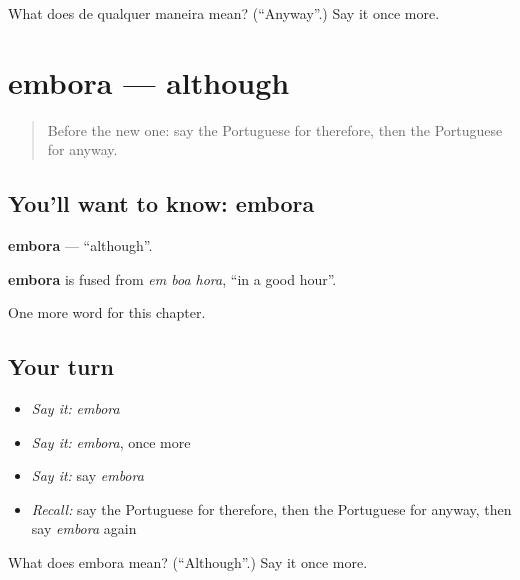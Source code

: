 \begin{tcolorbox}[breakable,colback=teal!4,colframe=teal!35!black,title={Before you move on}]
What does de qualquer maneira mean? (\textquotedblleft{}Anyway\textquotedblright{}.) Say it once more.
\end{tcolorbox}
\section[embora]{embora — although}

\label{lesson:PT-C152-embora}



\begin{quote}
Before the new one: say the Portuguese for therefore, then the Portuguese for anyway.
\end{quote}

\subsection*{You'll want to know: embora}
\textbf{embora} — \textquotedblleft{}although\textquotedblright{}.

\begin{cousinweb}
\textbf{embora} is fused from \emph{em boa hora}, \textquotedblleft{}in a good hour\textquotedblright{}.
\end{cousinweb}

\begin{grammarlens}[title={What you've built}]
One more word for this chapter.
\end{grammarlens}

\subsection*{Your turn}
\begin{itemize}
\raggedright
  \item \emph{Say it:} \emph{embora}
  \item \emph{Say it:} \emph{embora}, once more
  \item \emph{Say it:} say \emph{embora}
  \item \emph{Recall:} say the Portuguese for therefore, then the Portuguese for anyway, then say \emph{embora} again
\end{itemize}

\begin{tcolorbox}[breakable,colback=teal!4,colframe=teal!35!black,title={Before you move on}]
What does embora mean? (\textquotedblleft{}Although\textquotedblright{}.) Say it once more.
\end{tcolorbox}
